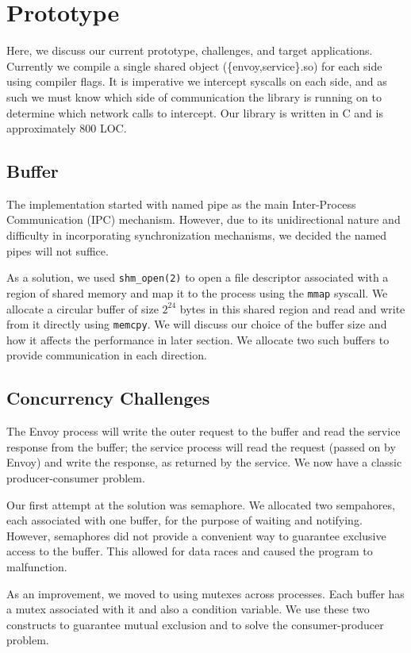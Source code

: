 \section{Prototype}
\label{sec:prototype}
Here, we discuss our current prototype, challenges, and target applications.
Currently we compile a single shared object (\{envoy,service\}.so) for each side using compiler flags.
It is imperative we intercept syscalls on each side, and as such we must know which side of communication the library is running on to determine which network calls to intercept.
Our library is written in C and is approximately 800 LOC.

\subsection{\sysname Buffer}
The implementation started with named pipe as the main Inter-Process Communication (IPC) mechanism.
However, due to its unidirectional nature and difficulty in incorporating synchronization mechanisms, we decided the named pipes will not suffice.

As a solution, we used \texttt{shm\_open(2)} to open a file descriptor associated with a region of shared memory and map it to the process using the \texttt{mmap} syscall. We allocate a circular buffer of size $2^{24}$ bytes in this shared region and read and write from it directly using \texttt{memcpy}. We will discuss our choice of the buffer size and how it affects the performance in later section. We allocate two such buffers to provide communication in each direction.

\subsection{Concurrency Challenges}
The Envoy process will write the outer request to the buffer and read the service response from the buffer; the service process will read the request (passed on by Envoy) and write the response, as returned by the service.
We now have a classic producer-consumer problem.

Our first attempt at the solution was semaphore.
We allocated two sempahores, each associated with one buffer, for the purpose of waiting and notifying.
However, semaphores did not provide a convenient way to guarantee exclusive access to the buffer.
This allowed for data races and caused the program to malfunction.

As an improvement, we moved to using mutexes across processes.
Each buffer has a mutex associated with it and also a condition variable.
We use these two constructs to guarantee mutual exclusion and to solve the consumer-producer problem.


